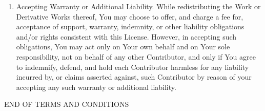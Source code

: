 \begin{enumerate}
\item Accepting Warranty or Additional Liability. While redistributing the Work or Derivative Works thereof, You may choose to offer, and charge a fee for, acceptance of support, warranty, indemnity, or other liability obligations and/or rights consistent with this License. However, in accepting such obligations, You may act only on Your own behalf and on Your sole responsibility, not on behalf of any other Contributor, and only if You agree to indemnify, defend, and hold each Contributor harmless for any liability incurred by, or claims asserted against, such Contributor by reason of your accepting any such warranty or additional liability.
\end{enumerate}
END OF TERMS AND CONDITIONS